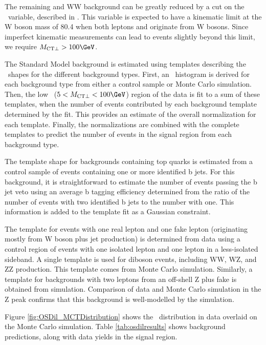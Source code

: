The remaining \ttbar and WW background can be greatly reduced by a cut on the \mctp\ variable, described in \cite{Matchev:2009ad}. This variable is expected to have a kinematic limit at the W boson mass of 80.4 \GeV when both leptons and \MET originate from W bosons. Since imperfect kinematic measurements can lead to events slightly beyond this limit, we require $\mctp > 100 \GeV$.

The Standard Model background is estimated using templates describing the \mctp\ shapes for the different background types. First, an \mctp\ histogram is derived for each background type from either a control sample or Monte Carlo simulation. Then, the low \mctp\ ($5 < \mctp < 100 \GeV$) region of the data is fit to a sum of these templates, when the number of events contributed by each background template determined by the fit. This provides an estimate of the overall normalization for each template. Finally, the normalizations are combined with the complete templates to predict the number of events in the signal region from each background type.

The template shape for backgrounds containing top quarks is estimated from a control sample of events containing one or more identified b jets. For this background, it is straightforward to estimate the number of events passing the b jet veto using an average b tagging efficiency determined from the ratio of the number of events with two identified b jets to the number with one. This information is added to the template fit as a Gaussian constraint.

The template for events with one real lepton and one fake lepton (originating mostly from W boson plus jet production) is determined from data using a control region of events with one isolated lepton and one lepton in a less-isolated sideband. A single template is used for diboson events, including WW, WZ, and ZZ production. This template comes from Monte Carlo simulation. Similarly, a template for backgrounds with two leptons from an off-shell Z plus fake \MET is obtained from simulation. Comparison of data and Monte Carlo simulation in the Z peak confirms that this background is well-modelled by the simulation. 

Figure \ref{fig:OSDil_MCTDistribution} shows the \mctp\ distribution in data overlaid on the Monte Carlo simulation. Table \ref{tab:osdilresults} shows background predictions, along with data yields in the signal region. 

